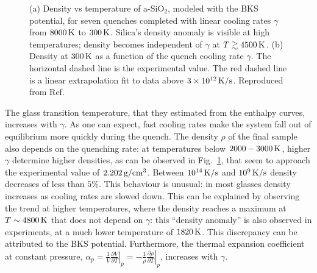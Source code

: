 \begin{figure}[!tb]
    \centering
    \hfill
    \caption{
    (a) Density vs temperature of a-SiO$_2$, modeled with the BKS potential, for seven quenches completed with linear cooling rates $\gamma$ from $8000\,\mathrm{K}$ to $300\,\mathrm{K}$. Silica's density anomaly is visible at high temperatures; density becomes independent of $\gamma$ at $T \gtrsim 4500\,\mathrm{K}$. 
    (b) Density at $300\,\mathrm{K}$ as a function of the quench cooling rate $\gamma$. The horizontal dashed line is the experimental value. The red dashed line is a linear extrapolation fit to data above $3\times 10^{12}\,\mathrm{K/s}$. 
    Reproduced from Ref.~\cite{Lane2015}}
    \label{fig:silica-bks-density}
\end{figure}

The glass transition temperature, that they estimated from the enthalpy curves, increases with $\gamma$. As one can expect, fast cooling rates make the system fall out of equilibrium more quickly during the quench. 
The density $\rho$ of the final sample also depends on the quenching rate: at temperatures below $2000-3000\,\mathrm{K}$, higher $\gamma$ determine higher densities, as can be observed in Fig.~\ref{fig:silica-bks-density}, that seem to approach the experimental value of $2.202\,\mathrm{g/cm^3}$. Between $10^{14}\,\mathrm{K/s}$ and $10^{9}\,\mathrm{K/s}$ density decreases of less than $5\%$. 
This behaviour is unusual: in most glasses density increases as cooling rates are slowed down. This can be explained by observing the trend at higher temperatures, where the density reaches a maximum at $T\sim 4800\,\mathrm{K}$ that does not depend on $\gamma$: this ``density anomaly'' is also observed in experiments, at a much lower temperature of $1820\,\mathrm{K}$. This discrepancy can be attributed to the BKS potential.
Furthermore, the thermal expansion coefficient at constant pressure, $\alpha_p = \frac{1}{V} \left.\frac{\partial V}{\partial T}\right|_p = -\frac{1}{\rho} \left.\frac{\partial \rho}{\partial T}\right|_p$, increases with $\gamma$.

